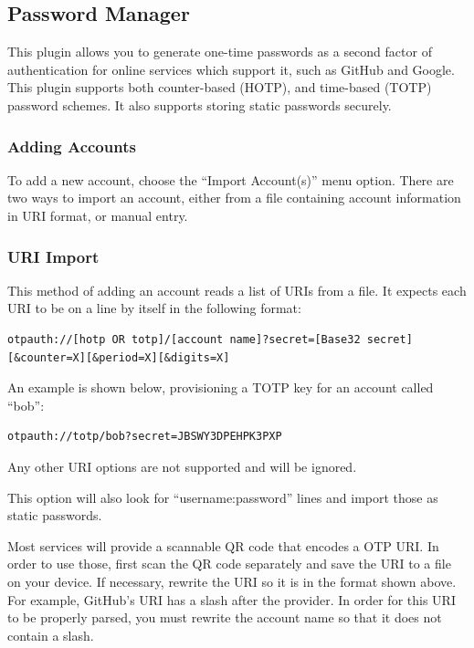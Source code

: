 \subsection{Password Manager}
This plugin allows you to generate one-time passwords as a second
factor of authentication for online services which support it, such as
GitHub and Google. This plugin supports both counter-based (HOTP), and
time-based (TOTP) password schemes. It also supports storing static
passwords securely.

\subsubsection{Adding Accounts}
To add a new account, choose the ``Import Account(s)'' menu
option. There are two ways to import an account, either from a file
containing account information in URI format, or manual entry.


\subsubsection{URI Import}
This method of adding an account reads a list of URIs from a file. It
expects each URI to be on a line by itself in the following format:

\begin{verbatim}
otpauth://[hotp OR totp]/[account name]?secret=[Base32 secret][&counter=X][&period=X][&digits=X]
\end{verbatim}

An example is shown below, provisioning a TOTP key for an account called ``bob'':

\begin{verbatim}
otpauth://totp/bob?secret=JBSWY3DPEHPK3PXP
\end{verbatim}

Any other URI options are not supported and will be ignored.

This option will also look for ``username:password'' lines and import
those as static passwords.

Most services will provide a scannable QR code that encodes a OTP
URI. In order to use those, first scan the QR code separately and save
the URI to a file on your device. If necessary, rewrite the URI so it
is in the format shown above. For example, GitHub's URI has a slash
after the provider. In order for this URI to be properly parsed, you
must rewrite the account name so that it does not contain a slash.

